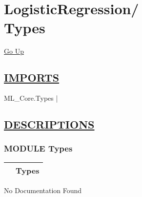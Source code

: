 \chapter*{\color{headfile}
{\large LogisticRegression\slash\hspace{0pt}}
 \\
Types
}
\hypertarget{ecldoc:toc:LogisticRegression.Types}{}
\hyperlink{ecldoc:toc:root/LogisticRegression}{Go Up}

\section*{\underline{\textsf{IMPORTS}}}
\begin{doublespace}
{\large
ML\_Core.Types |
}
\end{doublespace}

\section*{\underline{\textsf{DESCRIPTIONS}}}
\subsection*{\textsf{\colorbox{headtoc}{\color{white} MODULE}
Types}}

\hypertarget{ecldoc:LogisticRegression.Types}{}

{\renewcommand{\arraystretch}{1.5}
\begin{tabularx}{\textwidth}{|>{\raggedright\arraybackslash}l|X|}
\hline
\hspace{0pt}\mytexttt{\color{red} } & \textbf{Types} \\
\hline
\end{tabularx}
}

\par





No Documentation Found







